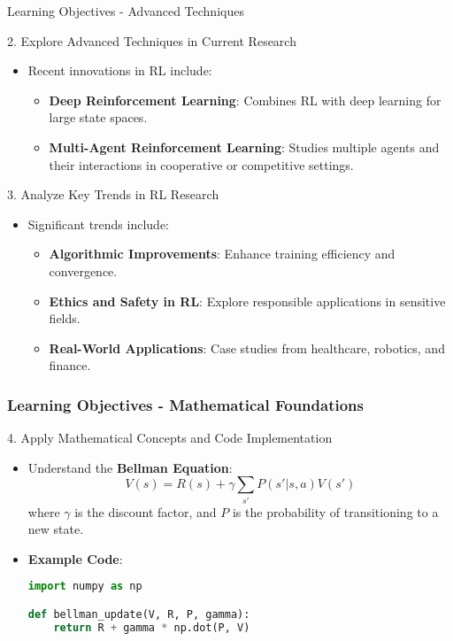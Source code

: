 \documentclass[aspectratio=169]{beamer}
\begin{document}
\begin{frame}[fragile]{Learning Objectives - Advanced Techniques}
    \begin{block}{2. Explore Advanced Techniques in Current Research}
        \begin{itemize}
            \item Recent innovations in RL include:
            \begin{itemize}
                \item \textbf{Deep Reinforcement Learning}: Combines RL with deep learning for large state spaces.
                \item \textbf{Multi-Agent Reinforcement Learning}: Studies multiple agents and their interactions in cooperative or competitive settings.
            \end{itemize}
        \end{itemize}
    \end{block}
    
    \begin{block}{3. Analyze Key Trends in RL Research}
        \begin{itemize}
            \item Significant trends include:
            \begin{itemize}
                \item \textbf{Algorithmic Improvements}: Enhance training efficiency and convergence.
                \item \textbf{Ethics and Safety in RL}: Explore responsible applications in sensitive fields.
                \item \textbf{Real-World Applications}: Case studies from healthcare, robotics, and finance.
            \end{itemize}
        \end{itemize}
    \end{block}
\end{frame}

\begin{frame}[fragile]
    \frametitle{Learning Objectives - Mathematical Foundations}
    \begin{block}{4. Apply Mathematical Concepts and Code Implementation}
        \begin{itemize}
            \item Understand the \textbf{Bellman Equation}:
            \begin{equation}
                V(s) = R(s) + \gamma \sum_{s'} P(s'|s,a)V(s')
            \end{equation}
            where $\gamma$ is the discount factor, and $P$ is the probability of transitioning to a new state.

            \item \textbf{Example Code}:
            \begin{lstlisting}[language=Python]
import numpy as np

def bellman_update(V, R, P, gamma):
    return R + gamma * np.dot(P, V)
            \end{lstlisting}
        \end{itemize}
    \end{block}
\end{frame}
\end{document}
